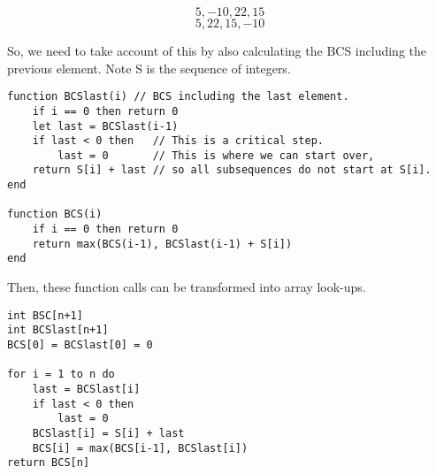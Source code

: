 \documentclass{article}
\begin{document}
    \[5, -10, 22, 15 \]
    \[5, 22, 15, -10 \]
    
    So, we need to take account of this by also calculating the BCS including the previous element. Note S is the sequence of integers.
    
    \begin{lstlisting}
function BCSlast(i) // BCS including the last element.
    if i == 0 then return 0
    let last = BCSlast(i-1)
    if last < 0 then   // This is a critical step.
        last = 0       // This is where we can start over,
    return S[i] + last // so all subsequences do not start at S[i].
end
    
function BCS(i)
    if i == 0 then return 0
    return max(BCS(i-1), BCSlast(i-1) + S[i])
end
    \end{lstlisting}
    
    Then, these function calls can be transformed into array look-ups.
    
    \begin{lstlisting}
int BSC[n+1]
int BCSlast[n+1]
BCS[0] = BCSlast[0] = 0

for i = 1 to n do
    last = BCSlast[i]
    if last < 0 then
        last = 0
    BCSlast[i] = S[i] + last
    BCS[i] = max(BCS[i-1], BCSlast[i])
return BCS[n]
    \end{lstlisting}
\end{document}
